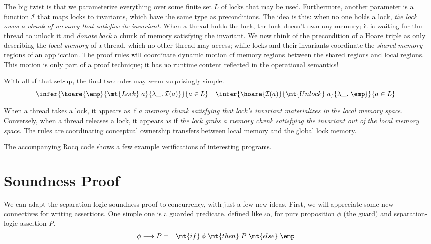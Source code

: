 \documentclass{amsbook}
\theoremstyle{definition}
\theoremstyle{remark}
\numberwithin{section}{chapter}
\numberwithin{equation}{chapter}
\begin{document}
The big twist is that we parameterize everything over some finite set $L$ of locks that may be used.
\invariants
Furthermore, another parameter is a function $\mathcal I$ that maps locks to invariants, which have the same type as preconditions.
The idea is this: when no one holds a lock, \emph{the lock owns a chunk of memory that satisfies its invariant}.
When a thread holds the lock, the lock doesn't own any memory; it is waiting for the thread to unlock it and \emph{donate back} a chunk of memory satisfying the invariant.
We now think of the precondition of a Hoare triple as only describing the \emph{local memory} of a thread, which no other thread may access; while locks and their invariants coordinate the \emph{shared memory} regions of an application.
The proof rules will coordinate dynamic motion of memory regions between the shared regions and local regions.
This motion is only part of a proof technique; it has no runtime content reflected in the operational semantics!

With all of that set-up, the final two rules may seem surprisingly simple.
$$\infer{\hoare{\emp}{\mt{Lock} \; a}{\lambda \_. \; \mathcal I(a)}}{
  a \in L
}
\quad \infer{\hoare{\mathcal I(a)}{\mt{Unlock} \; a}{\lambda \_. \; \emp}}{
  a \in L
}$$

When a thread takes a lock, it appears as if \emph{a memory chunk satisfying that lock's invariant materializes in the local memory space}.
Conversely, when a thread releases a lock, it appears as if \emph{the lock grabs a memory chunk satisfying the invariant out of the local memory space}.
The rules are coordinating conceptual ownership transfers between local memory and the global lock memory.

The accompanying Rocq code shows a few example verifications of interesting programs.

\section{Soundness Proof}

\newcommand{\guarded}[2]{#1 \longrightarrow #2}

We can adapt the separation-logic soundness proof to concurrency, with just a few new ideas.
First, we will appreciate some new connectives for writing assertions.
One simple one is a guarded predicate, defined like so, for pure proposition $\phi$ (the guard) and separation-logic assertion $P$.
\begin{eqnarray*}
  \guarded{\phi}{P} &=& \mt{if} \; \phi \; \mt{then} \; P \; \mt{else} \; \emp
\end{eqnarray*}
\end{document}
